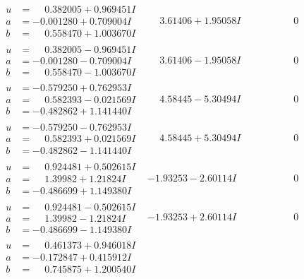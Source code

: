 \documentclass[1p]{elsarticle_modified}
\theoremstyle{definition}
\begin{document}
$$\begin{array}{c|c|c}
\begin{aligned}
u &= \phantom{-}0.382005 + 0.969451 I \\
a &= -0.001280 + 0.709004 I \\
b &= \phantom{-}0.558470 + 1.003670 I\end{aligned}
 & \phantom{-}3.61406 + 1.95058 I & \phantom{-0.000000 } 0 \\ \hline\begin{aligned}
u &= \phantom{-}0.382005 - 0.969451 I \\
a &= -0.001280 - 0.709004 I \\
b &= \phantom{-}0.558470 - 1.003670 I\end{aligned}
 & \phantom{-}3.61406 - 1.95058 I & \phantom{-0.000000 } 0 \\ \hline\begin{aligned}
u &= -0.579250 + 0.762953 I \\
a &= \phantom{-}0.582393 - 0.021569 I \\
b &= -0.482862 + 1.141440 I\end{aligned}
 & \phantom{-}4.58445 - 5.30494 I & \phantom{-0.000000 } 0 \\ \hline\begin{aligned}
u &= -0.579250 - 0.762953 I \\
a &= \phantom{-}0.582393 + 0.021569 I \\
b &= -0.482862 - 1.141440 I\end{aligned}
 & \phantom{-}4.58445 + 5.30494 I & \phantom{-0.000000 } 0 \\ \hline\begin{aligned}
u &= \phantom{-}0.924481 + 0.502615 I \\
a &= \phantom{-}1.39982 + 1.21824 I \\
b &= -0.486699 + 1.149380 I\end{aligned}
 & -1.93253 - 2.60114 I & \phantom{-0.000000 } 0 \\ \hline\begin{aligned}
u &= \phantom{-}0.924481 - 0.502615 I \\
a &= \phantom{-}1.39982 - 1.21824 I \\
b &= -0.486699 - 1.149380 I\end{aligned}
 & -1.93253 + 2.60114 I & \phantom{-0.000000 } 0 \\ \hline\begin{aligned}
u &= \phantom{-}0.461373 + 0.946018 I \\
a &= -0.172847 + 0.415912 I \\
b &= \phantom{-}0.745875 + 1.200540 I\end{aligned}

\end{array}$$
\end{document}
